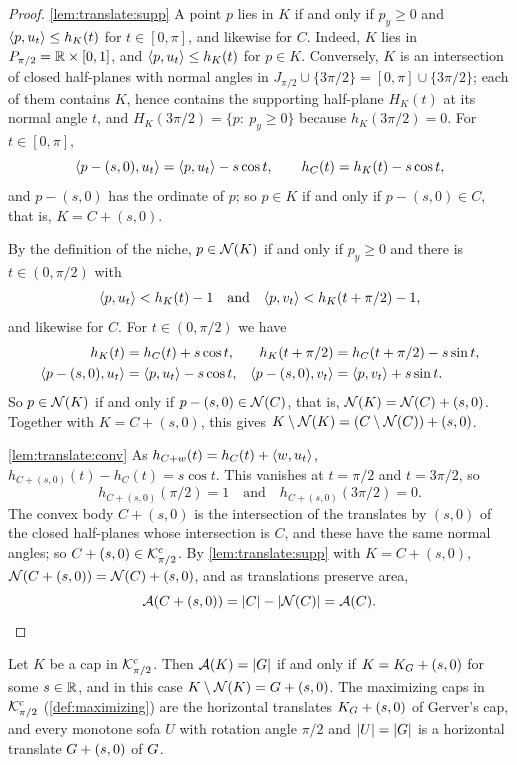 \begin{proof}
\ref{lem:translate:supp} A point $p$ lies in $K$ if and only if $p_y\ge0$ and
$\langle p,u_t\rangle\le h_K(t)$ for $t\in[0,\pi]$, and likewise for $C$. Indeed, $K$ lies
in $P_{\pi/2}=\mathbb{R}\times[0,1]$, and $\langle p,u_t\rangle\le h_K(t)$ for $p\in K$.
Conversely, $K$ is an intersection of closed half-planes with normal angles in
$J_{\pi/2}\cup\{3\pi/2\}=[0,\pi]\cup\{3\pi/2\}$; each of them contains $K$,
hence contains the supporting half-plane $H_K(t)$ at its normal angle $t$, and
$H_K(3\pi/2)=\{p:\ p_y\ge0\}$ because $h_K(3\pi/2)=0$. For $t\in[0,\pi]$,
\[
  \langle p-(s,0),u_t\rangle=\langle p,u_t\rangle-s\cos t,\qquad h_C(t)=h_K(t)-s\cos t,
\]
and $p-(s,0)$ has the ordinate of $p$; so $p\in K$ if and only if
$p-(s,0)\in C$, that is, $K=C+(s,0)$.

By the definition of the niche, $p\in\mathcal{N}(K)$ if and only if $p_y\ge0$ and there
is $t\in(0,\pi/2)$ with
\[
  \langle p,u_t\rangle<h_K(t)-1\quad\text{and}\quad\langle p,v_t\rangle<h_K(t+\pi/2)-1,
\]
and likewise for $C$. For $t\in(0,\pi/2)$ we have
\begin{align*}
  h_K(t)&=h_C(t)+s\cos t,&h_K(t+\pi/2)&=h_C(t+\pi/2)-s\sin t,\\
  \langle p-(s,0),u_t\rangle&=\langle p,u_t\rangle-s\cos t,&\langle p-(s,0),v_t\rangle&=\langle p,v_t\rangle+s\sin t.
\end{align*}
So $p\in\mathcal{N}(K)$ if and only if $p-(s,0)\in\mathcal{N}(C)$, that is,
$\mathcal{N}(K)=\mathcal{N}(C)+(s,0)$. Together with $K=C+(s,0)$, this gives
$K\setminus\mathcal{N}(K)=(C\setminus\mathcal{N}(C))+(s,0)$.

\ref{lem:translate:conv} As $h_{C+w}(t)=h_C(t)+\langle w,u_t\rangle$,
$h_{C+(s,0)}(t)-h_C(t)=s\cos t$. This vanishes at $t=\pi/2$ and $t=3\pi/2$, so
\[
  h_{C+(s,0)}(\pi/2)=1\quad\text{and}\quad h_{C+(s,0)}(3\pi/2)=0.
\]
The convex body $C+(s,0)$ is the intersection of the translates by $(s,0)$ of
the closed half-planes whose intersection is $C$, and these have the same
normal angles; so $C+(s,0)\in\mathcal{K}^{\mathrm{c}}_{\pi/2}$. By \ref{lem:translate:supp} with $K=C+(s,0)$,
$\mathcal{N}(C+(s,0))=\mathcal{N}(C)+(s,0)$, and as translations preserve area,
\[
  \mathcal{A}(C+(s,0))=\lvert C\rvert-\lvert \mathcal{N}(C)\rvert=\mathcal{A}(C).\qedhere
\]
\end{proof}

\begin{theorem}\label{thm:caps}
Let $K$ be a cap in $\mathcal{K}^{\mathrm{c}}_{\pi/2}$. Then $\mathcal{A}(K)=\lvert G\rvert$ if and only if
$K=K_G+(s,0)$ for some $s\in\mathbb{R}$, and in this case $K\setminus\mathcal{N}(K)=G+(s,0)$.
The maximizing caps in $\mathcal{K}^{\mathrm{c}}_{\pi/2}$ (\cref{def:maximizing}) are the horizontal
translates $K_G+(s,0)$ of Gerver's cap, and every monotone sofa $U$ with
rotation angle $\pi/2$ and $\lvert U\rvert=\lvert G\rvert$ is a horizontal translate
$G+(s,0)$ of $G$.
\end{theorem}

